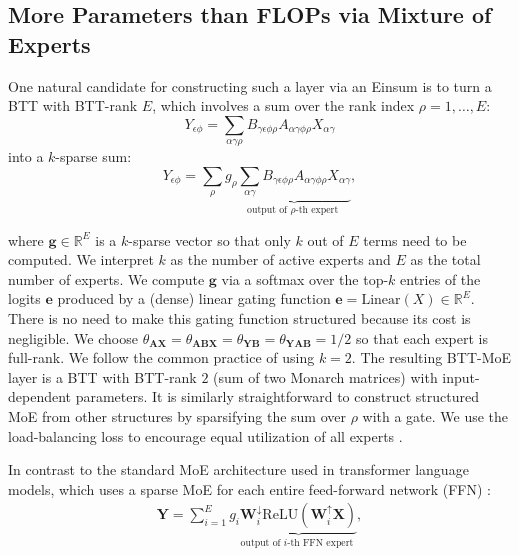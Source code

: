 \documentclass{article}
\newcommand{\mbf}[1]{{\boldsymbol{\mathbf{#1}}}}
\newcommand{\bm}{\mbf}
\newcommand{\R}{\mathbb{R}}
\begin{document}
\subsection{More Parameters than FLOPs via Mixture of Experts}
One natural candidate for constructing such a layer via an Einsum is to turn a BTT with BTT-rank $E$, which involves a sum over the rank index $\rho=1, \ldots, E:$
\begin{equation}
      Y_{\epsilon \phi}
      =
      \sum_{\alpha \gamma \rho}
         B_{\gamma \epsilon \phi \rho} A_{\alpha \gamma \phi \rho} X_{\alpha \gamma}
\end{equation}
into a $k$-sparse sum:
\begin{equation}
      Y_{\epsilon \phi}
      =
      \sum_\rho g_\rho \underbrace{{\sum_{\alpha \gamma}
         B_{\gamma \epsilon \phi \rho} A_{\alpha \gamma \phi \rho} X_{\alpha \gamma}}}_{\text{output of } \rho \text{-th expert }},
\end{equation}

where $\bm{g} \in \R^{E}$ is a $k$-sparse vector so that only $k$ out of $E$ terms need to be computed. We interpret $k$ as the number of active experts and $E$ as the total number of experts. We compute $\bm{g}$ via a softmax over the top-$k$ entries of the logits $\bm{e}$ produced by a (dense) linear gating function $\bm{e} = \mathrm{Linear}(X) \in \R^{E}.$ There is no need to make this gating function structured because its cost is negligible. We choose $\theta_\bm{AX} = \theta_\bm{ABX} = \theta_\bm{YB} = \theta_\bm{YAB} = 1/2$ so that each expert is full-rank. We follow the common practice of using $k=2.$ The resulting BTT-MoE layer is a BTT with BTT-rank $2$ (sum of two Monarch matrices) with input-dependent parameters. It is similarly straightforward to construct structured MoE from other structures by sparsifying the sum over $\rho$ with a gate. We use the load-balancing loss to encourage equal utilization of all experts \citep{shazeer2017outrageously, fedus2022switch, shen2024jetmoe}.

In contrast to the standard MoE architecture used in transformer language models, which uses a sparse MoE for each entire feed-forward network (FFN) \citep{shazeer2017outrageously, fedus2022switch, jiang2024mixtral}:
\vspace{-2mm}
\begin{align}
    \bm{Y} = \sum_{i=1}^{E} g_i \underbrace{\bm{W}^\downarrow_i \mathrm{ReLU}(\bm{W}^\uparrow_i \bm{X})}_{\text{output of } i \text{-th FFN expert }},
\end{align}
\vspace{-5mm}
\end{document}
